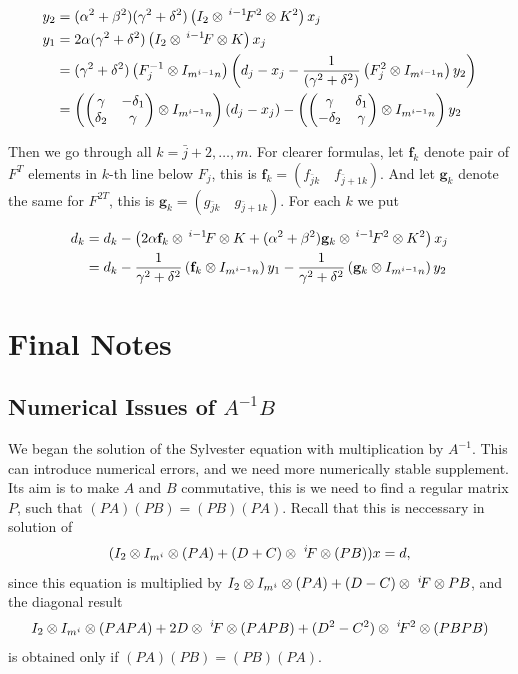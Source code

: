 \documentclass[11pt,a4paper]{article}
\begin{document}
\begin{enumerate}
\begin{align*}
y_2&=(\alpha^2+\beta^2)(\gamma^2+\delta^2)
\left(I_2\otimes\,^{i-1}\!F^2\otimes K^2\right)x_j\\
y_1&=2\alpha(\gamma^2+\delta^2)\left(I_2\otimes\,^{i-1}\!F\otimes
K\right)x_j\\
   &=(\gamma^2+\delta^2)
      \left(F_j^{-1}
         \otimes I_{m^{i-1}n}\right)
      \left(d_j-x_j-\frac{1}{(\gamma^2+\delta^2)}
        \left(
         F_j^2
         \otimes I_{m^{i-1}n}\right)y_2\right)\\
   &=\left(\begin{pmatrix}\gamma&-\delta_1\cr\delta_2&\gamma\end{pmatrix}
           \otimes I_{m^{i-1}n}\right)(d_j-x_j)
     -\left(\begin{pmatrix}\gamma&\delta_1\cr-\delta_2&\gamma\end{pmatrix}
           \otimes I_{m^{i-1}n}\right)y_2
\end{align*}

Then we go through all $k=\bar j+2,\ldots, m$. For clearer formulas, let
$\mathbf f_k$ denote pair of $F^T$ elements in $k$-th line below $F_j$,
this is $\mathbf f_k=(f_{\bar jk}\quad f_{\bar j+1k})$. And let $\mathbf g_k$
denote the same for $F^{2T}$, this is $\mathbf g_k=(g_{\bar jk}\quad
g_{\bar j+1k})$. For each $k$ we put

\begin{align*}
d_k &= d_k - \left(2\alpha\mathbf f_k\otimes
                   \,^{i-1}\!F\otimes K +
                   (\alpha^2+\beta^2)\mathbf g_k\otimes
                   \,^{i-1}\!F^2\otimes K^2\right)x_j\\
    &= d_k - \frac{1}{\gamma^2+\delta^2}
             \left(\mathbf f_k\otimes
                   I_{m^{i-1}n}\right)y_1
           - \frac{1}{\gamma^2+\delta^2}
             \left(\mathbf g_k\otimes
                   I_{m^{i-1}n}\right)y_2
\end{align*}

\end{enumerate}

\section{Final Notes}

\subsection{Numerical Issues of $A^{-1}B$}

We began the solution of the Sylvester equation with multiplication by
$A^{-1}$.  This can introduce numerical errors, and we need more
numerically stable supplement. Its aim is to make $A$ and $B$
commutative, this is we need to find a regular matrix $P$, such that
$(PA)(PB)=(PB)(PA)$. Recall that this is neccessary in solution of
$$
(I_2\otimes I_{m^i}\otimes (PA)+(D+C)\otimes\,\,^i\!F\otimes (PB))x=d,
$$
since this equation is
multiplied by $I_2\otimes I_{m^i}\otimes (PA)+(D-C)\otimes\,\,^i\!F\otimes PB$,
and the diagonal
result
$$
I_2\otimes I_{m^i}\otimes (PAPA) + 2D\otimes\,\,^i\!F\otimes (PAPB) +
(D^2-C^2)\otimes\,\,^i\!F^2\otimes (PBPB)
$$
is obtained only if
$(PA)(PB)=(PB)(PA)$.
\end{document}
